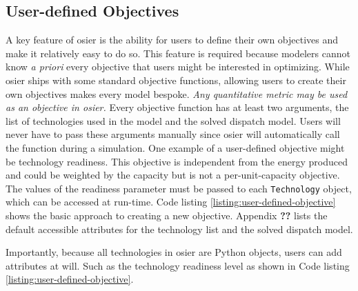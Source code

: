 \subsection{User-defined Objectives}

A key feature of \ac{osier} is the ability for users to define their own
objectives and make it relatively easy to do so. This feature is required
because modelers cannot know \textit{a priori} every objective that users might
be interested in optimizing. While \ac{osier} ships with some standard objective
functions, allowing users to create their own objectives makes every model
bespoke. \textit{Any quantitative metric may be used as an objective in
\ac{osier}.} Every objective function has at least two arguments, the list of
technologies used in the model and the solved dispatch model. Users will never
have to pass these arguments manually since \ac{osier} will automatically call
the function during a simulation. One example of a user-defined objective might
be technology readiness. This objective is independent from the energy produced
and could be weighted by the capacity but is not a per-unit-capacity objective.
The values of the readiness parameter must be passed to each \texttt{Technology}
object, which can be accessed at run-time. Code listing
\ref{listing:user-defined-objective} shows the basic approach to creating a new
objective. Appendix \textbf{??} lists the default accessible attributes for the
technology list and the solved dispatch model.

\noindent
Importantly, because all technologies in \ac{osier} are Python objects, users
can add attributes at will. Such as the technology readiness level as shown in
Code listing \ref{listing:user-defined-objective}. 

